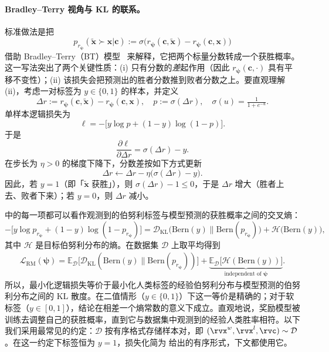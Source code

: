 \paragraph{Bradley--Terry 视角与 KL 的联系。}
标准做法是把
\[
p_{r_{\bm\psi}}(\tilde{\mathbf x}\succ \mathbf x|\mathbf c)
:= \sigma \big(r_{\bm\psi}(\mathbf c,\tilde{\mathbf x})-r_{\bm\psi}(\mathbf c,\mathbf x)\big)
\]
借助 Bradley--Terry（BT）模型~\citep{bradley1952rank} 来解释，它把两个标量分数转成一个获胜概率。这一写法突出了两个关键性质：(i) 只有分数的\emph{差}起作用（因此 $r_{\bm\psi}(\mathbf c,\cdot)$ 具有平移不变性）；(ii) 该损失会把预测出的胜者分数推到败者分数之上。要直观理解 (ii)，考虑一对标签为 $y\in\{0,1\}$ 的样本，并定义
\[
\Delta r := r_{\bm\psi}(\mathbf c,\tilde{\mathbf x})-r_{\bm\psi}(\mathbf c,\mathbf x),
\quad
p:=\sigma(\Delta r),\quad \sigma(u)=\tfrac{1}{1+e^{-u}}.
\]
单样本逻辑损失为
\[
\ell=-\big[y\log p+(1-y)\log(1-p)\big].
\]
于是
\[
\frac{\partial \ell}{\partial \Delta r}=\sigma(\Delta r)-y.
\]
在步长为 $\eta>0$ 的梯度下降下，分数差按如下方式更新
\[
\Delta r \leftarrow \Delta r-\eta\big(\sigma(\Delta r)-y\big).
\]
因此，若 $y=1$（即「$\tilde{\mathbf x}$ 获胜」），则 $\sigma(\Delta r)-1\le 0$，于是 $\Delta r$ 增大（胜者上去、败者下来）；若 $y=0$，则 $\Delta r$ 减小。

 中的每一项都可以看作观测到的伯努利标签与模型预测的获胜概率之间的交叉熵：
\[
-\big[y\log p_{r_{\bm\psi}}+(1-y)\log(1-p_{r_{\bm\psi}})\big]
= \mathcal D_{\mathrm{KL}} \big(\mathrm{Bern}(y) \big\| \mathrm{Bern}(p_{r_{\bm\psi}})\big)
+ \mathcal H \big(\mathrm{Bern}(y)\big),
\]
其中 $\mathcal H$ 是目标伯努利分布的熵。在数据集 $\mathcal D$ 上取平均得到
\begin{align}\label{eq:reward_loss}
    \mathcal L_{\mathrm{RM}}(\bm\psi)
= \mathbb E_{\mathcal D} \Big[\mathcal D_{\mathrm{KL}}\left(\mathrm{Bern}(y) \big\| \mathrm{Bern}(p_{r_{\bm\psi}})\right)\Big]
+ \underbrace{\mathbb E_{\mathcal D} \big[\mathcal H(\mathrm{Bern}(y))\big]}_{\text{independent of }\bm\psi}.
\end{align}
所以，最小化逻辑损失等价于最小化人类标签的经验伯努利分布与模型预测的伯努利分布之间的 KL 散度。在二值情形（$y\in\{0,1\}$）下这一等价是精确的；对于软标签（$y\in[0,1]$），结论在相差一个熵常数的意义下成立。直观地说，奖励模型被训练去调整自己的获胜概率，直到它与数据集中观测到的经验人类胜率相符。以下我们采用最常见的约定：$\mathcal D$ 按有序格式存储样本对，即 $(\rvx^w, \rvx^l, \rvc) \sim \mathcal D$。在这一约定下标签恒为 $y=1$，损失化简为  给出的有序形式，下文都使用它。

